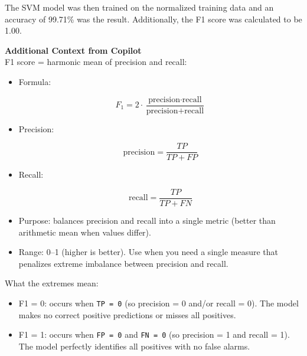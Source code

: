 The SVM model was then trained on the normalized training data and an accuracy of 99.71\% was the result.  Additionally, the F1 score was calculated to be 1.00.

\begin{framed}
\textbf{Additional Context from Copilot}\\
F1 score = harmonic mean of precision and recall:

\begin{itemize}
\item Formula:

\begin{equation}
F_1 = 2\cdot\frac{\text{precision}\cdot\text{recall}}{\text{precision}+\text{recall}}
\end{equation}


\item Precision:

\begin{equation}
\text{precision} = \frac{TP}{TP + FP}
\end{equation}


\item Recall:

\begin{equation}
\text{recall} = \frac{TP}{TP + FN}
\end{equation}


\item Purpose: balances precision and recall into a single metric (better than arithmetic mean when values differ).
\item Range: 0--1 (higher is better). Use when you need a single measure that penalizes extreme imbalance between precision and recall.
\end{itemize}

What the extremes mean:

\begin{itemize}
\item F1 = 0: occurs when \texttt{TP = 0} (so precision = 0 and/or recall = 0). The model makes no correct positive predictions or misses all positives.
\item F1 = 1: occurs when \texttt{FP = 0} and \texttt{FN = 0} (so precision = 1 and recall = 1). The model perfectly identifies all positives with no false alarms.
\end{itemize}
\end{framed}

